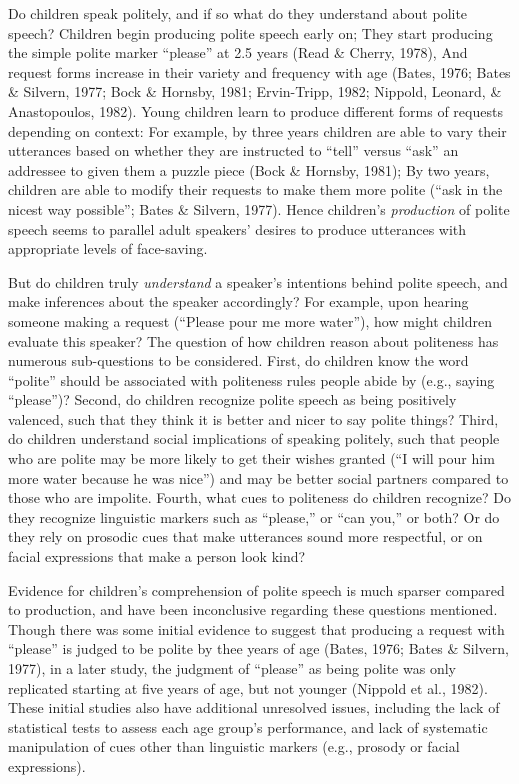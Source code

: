 \documentclass[10pt, letterpaper]{article}
\begin{document}
Do children speak politely, and if so what do they understand about
polite speech? Children begin producing polite speech early on; They
start producing the simple polite marker ``please'' at 2.5 years (Read
\& Cherry, 1978), And request forms increase in their variety and
frequency with age (Bates, 1976; Bates \& Silvern, 1977; Bock \&
Hornsby, 1981; Ervin-Tripp, 1982; Nippold, Leonard, \& Anastopoulos,
1982). Young children learn to produce different forms of requests
depending on context: For example, by three years children are able to
vary their utterances based on whether they are instructed to ``tell''
versus ``ask'' an addressee to given them a puzzle piece (Bock \&
Hornsby, 1981); By two years, children are able to modify their requests
to make them more polite (``ask in the nicest way possible''; Bates \&
Silvern, 1977). Hence children's \emph{production} of polite speech
seems to parallel adult speakers' desires to produce utterances with
appropriate levels of face-saving.

But do children truly \emph{understand} a speaker's intentions behind
polite speech, and make inferences about the speaker accordingly? For
example, upon hearing someone making a request (``Please pour me more
water''), how might children evaluate this speaker? The question of how
children reason about politeness has numerous sub-questions to be
considered. First, do children know the word ``polite'' should be
associated with politeness rules people abide by (e.g., saying
``please'')? Second, do children recognize polite speech as being
positively valenced, such that they think it is better and nicer to say
polite things? Third, do children understand social implications of
speaking politely, such that people who are polite may be more likely to
get their wishes granted (``I will pour him more water because he was
nice'') and may be better social partners compared to those who are
impolite. Fourth, what cues to politeness do children recognize? Do they
recognize linguistic markers such as ``please,'' or ``can you,'' or
both? Or do they rely on prosodic cues that make utterances sound more
respectful, or on facial expressions that make a person look kind?

Evidence for children's comprehension of polite speech is much sparser
compared to production, and have been inconclusive regarding these
questions mentioned. Though there was some initial evidence to suggest
that producing a request with ``please'' is judged to be polite by thee
years of age (Bates, 1976; Bates \& Silvern, 1977), in a later study,
the judgment of ``please'' as being polite was only replicated starting
at five years of age, but not younger (Nippold et al., 1982). These
initial studies also have additional unresolved issues, including the
lack of statistical tests to assess each age group's performance, and
lack of systematic manipulation of cues other than linguistic markers
(e.g., prosody or facial expressions).
\end{document}
